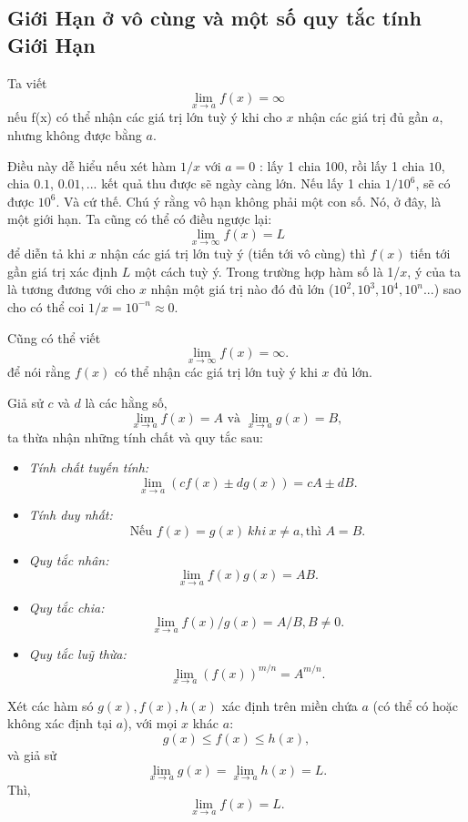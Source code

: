 \subsection{Giới Hạn ở vô cùng và một số quy tắc tính Giới Hạn}
\begin{definition} Ta viết
    \begin{equation*}\lim_{x\rightarrow a}f(x)=\infty\end{equation*}
nếu f(x) có thể nhận các giá trị lớn tuỳ ý khi cho $x$ nhận các giá trị đủ gần $a$, nhưng không được bằng $a$.
\end{definition}
Điều này dễ hiểu nếu xét hàm $1/x$ với $a=0$ : lấy 1 chia 100, rồi lấy 1 chia $10$, chia $0.1$, $0.01,...$ kết quả thu được sẽ ngày càng lớn. Nếu lấy 1 chia $1/10^6$, sẽ có được $10^6$. Và cứ thế.
Chú ý rằng vô hạn không phải một con số. Nó, ở đây, là một giới hạn.\newline
Ta cũng có thể có điều ngược lại:$$\lim_{x\rightarrow\infty}f(x)=L$$ để diễn tả khi $x$ nhận các giá trị lớn tuỳ ý (tiến tới vô cùng) thì $f(x)$ tiến tới gần giá trị xác định $L$ một cách tuỳ ý. Trong trường hợp hàm số là 1/$x$, ý của ta là tương đương với cho $x$ nhận một giá trị nào đó đủ lớn ($10^2,10^3,10^4,10^n...$) sao cho có thể coi $1/x =10^{-n}\approx 0.$ 

Cũng có thể viết  $$\lim_{x\rightarrow\infty}f(x)=\infty.$$ để nói rằng $f(x)$ có thể nhận các giá trị lớn tuỳ ý khi $x$ đủ lớn.\newline    
\vspace{5pt}

 Giả sử $c$ và $d$ là các hằng số, \[\lim_{x\rightarrow a}f(x)=A \text{ và } \lim_{x\rightarrow a}g(x)=B, \] ta thừa nhận những tính chất và quy tắc sau:
\begin{itemize}
 \item \emph{Tính chất tuyến tính:} \[\lim_{x\rightarrow a}(cf(x)\pm dg(x))=cA \pm dB.\]
 \item \emph{Tính duy nhất:} \[\text{Nếu } f(x)=g(x)~khi~x\neq a,\text{thì } A=B.\]
 \item \emph{Quy tắc nhân:} \[\lim_{x\rightarrow a}f(x)g(x)=AB.\]
 \item \emph{Quy tắc chia:} \[\lim_{x\rightarrow a}f(x)/g(x)=A/B, B\neq 0.\]
 \item \emph{Quy tắc luỹ thừa:} \[\lim_{x\rightarrow a}(f(x))^{m/n}=A^{m/n}.\]
\end{itemize}
\begin{theorem}
    Xét các hàm só $g(x), f(x), h(x)$ xác định trên miền chứa $a$ (có thể có hoặc không xác định tại $a$), với mọi $x$ khác $a$:
    \[g(x)\leq f(x)\leq h(x),\] và giả sử \[\lim_{x\rightarrow a}g(x)=\lim_{x\rightarrow a}h(x)=L.\]
    Thì, \[\lim_{x\rightarrow a}f(x)=L.\]
\end{theorem}